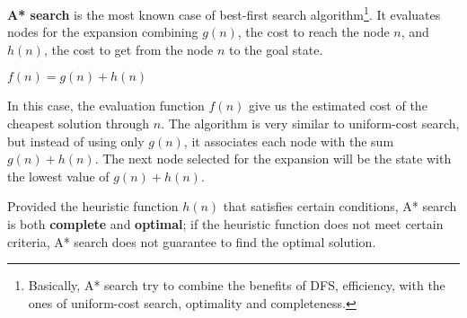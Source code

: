 \textbf{A* search} is the most known case of best-first search algorithm\footnote{Basically, A* search try to combine the benefits of DFS, efficiency, with the ones of
uniform-cost search, optimality and completeness.}. It evaluates nodes for the expansion combining $g(n)$, the cost to reach the node $n$, and 
$h(n)$, the cost to get from the node $n$ to the goal state. \vspace{3.5pt}

\begin{center}
    $f(n) = g(n) + h(n)$
\end{center} \vspace{3.5pt}

In this case, the evaluation function $f(n)$ give us the estimated cost of the cheapest solution through $n$. The algorithm is very similar to uniform-cost search, but instead
of using only $g(n)$, it associates each node with the sum $g(n) + h(n)$. The next node selected for the expansion will be the state with the lowest value of $g(n) + h(n)$. \vspace{3.5pt}

Provided the heuristic function $h(n)$ that satisfies certain conditions, A* search is both \textbf{complete} and \textbf{optimal}; if the heuristic function does not meet 
certain criteria, A* search does not guarantee to find the optimal solution.